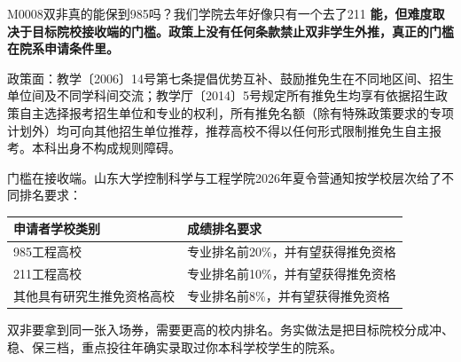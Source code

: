 \begin{qa}{M0008}{双非真的能保到985吗？我们学院去年好像只有一个去了211}
\textbf{能，但难度取决于目标院校接收端的门槛。政策上没有任何条款禁止双非学生外推，真正的门槛在院系申请条件里。}

政策面：教学〔2006〕14号第七条提倡优势互补、鼓励推免生在不同地区间、招生单位间及不同学科间交流；教学厅〔2014〕5号规定所有推免生均享有依据招生政策自主选择报考招生单位和专业的权利，所有推免名额（除有特殊政策要求的专项计划外）均可向其他招生单位推荐，推荐高校不得以任何形式限制推免生自主报考。本科出身不构成规则障碍。

门槛在接收端。山东大学控制科学与工程学院2026年夏令营通知按学校层次给了不同排名要求：

\par\vspace{2pt}\nobreak\begin{center}\footnotesize
\begin{tabularx}{\textwidth}{>{\raggedright\arraybackslash}X>{\raggedright\arraybackslash}X}
\toprule
\textbf{申请者学校类别} & \textbf{成绩排名要求} \\ \midrule
985工程高校 & 专业排名前20\%，并有望获得推免资格 \\
211工程高校 & 专业排名前10\%，并有望获得推免资格 \\
其他具有研究生推免资格高校 & 专业排名前8\%，并有望获得推免资格 \\
\bottomrule
\end{tabularx}
\end{center}\vspace{2pt}\par

双非要拿到同一张入场券，需要更高的校内排名。务实做法是把目标院校分成冲、稳、保三档，重点投往年确实录取过你本科学校学生的院系。
\end{qa}

